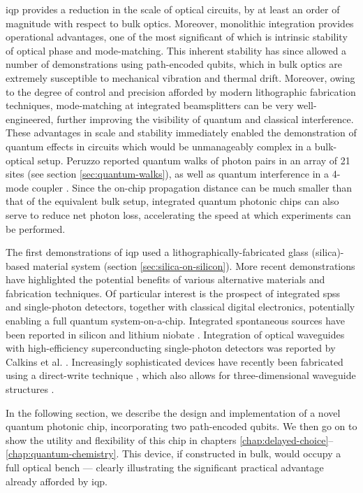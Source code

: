 \Gls{iqp} provides a reduction in the scale of optical circuits, by at least an order of magnitude with respect to bulk optics. Moreover, monolithic integration provides operational advantages, one of the most significant of which is intrinsic stability of optical phase and mode-matching. 
This inherent stability has since allowed a number of demonstrations using path-encoded qubits, which in bulk optics are extremely susceptible to mechanical vibration and thermal drift. 
Moreover, owing to the degree of control and precision afforded by modern lithographic fabrication techniques, mode-matching at integrated beamsplitters can be very well-engineered, further improving the visibility of quantum and classical interference.
These advantages in scale and stability immediately enabled the demonstration of quantum effects in circuits which would be unmanageably complex in a bulk-optical setup. Peruzzo \cite{Peruzzo2010} reported quantum walks of photon pairs in an array of 21 sites  (see section \ref{sec:quantum-walks}), as well as quantum interference in a 4-mode coupler \cite{Peruzzo2011}.
Since the on-chip propagation distance can be much smaller than that of the equivalent bulk setup, integrated quantum photonic chips can also serve to reduce net photon loss, accelerating the speed at which experiments can be performed.

The first demonstrations of \gls{iqp} used a lithographically-fabricated glass (silica)-based material system (section \ref{sec:silica-on-silicon}). More recent demonstrations have highlighted the potential benefits of various alternative materials and fabrication techniques. Of particular interest is the prospect of integrated \glspl{sps} and single-photon detectors, together with classical digital electronics, potentially enabling a full quantum system-on-a-chip. Integrated spontaneous sources have been reported in silicon \cite{Matsuda2012, Silverstone2013} and lithium niobate \cite{Sohler2008}. Integration of optical waveguides with high-efficiency superconducting single-photon detectors was reported by Calkins et al. \cite{Calkins2013}. Increasingly sophisticated devices \cite{Spagnolo2013, Crespi2011, Tillmann2013} have recently been fabricated using a direct-write technique \cite{Marshall2009}, which also allows for three-dimensional waveguide structures \cite{Poulios2013, Rechtsman2013}.

In the following section, we describe the design and implementation of a novel quantum photonic chip, incorporating two path-encoded qubits. We then go on to show the utility and flexibility of this chip in chapters \ref{chap:delayed-choice}--\ref{chap:quantum-chemistry}. This device, if constructed in bulk, would occupy a full optical bench --- clearly illustrating the significant practical advantage already afforded by \gls{iqp}.



